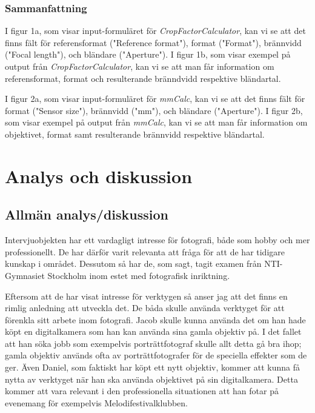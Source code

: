 \documentclass[11pt]{article}
\begin{document}
\clearpage

\subsubsection{Sammanfattning}
\sloppy
I figur 1a, som visar input-formuläret för \emph{CropFactorCalculator}, kan vi
se att det finns fält för referensformat ("Reference format"), format
("Format"), brännvidd ("Focal length"), och bländare ("Aperture"). I figur 1b,
som visar exempel på output från \emph{CropFactorCalculator}, kan vi se att man
får information om referensformat, format och resulterande bränndvidd respektive
bländartal.\par

I figur 2a, som visar input-formuläret för \emph{mmCalc}, kan vi se att det
finns fält för format ("Sensor size"), brännvidd ("mm"), och bländare
("Aperture"). I figur 2b, som visar exempel på output från \emph{mmCalc}, kan vi
se att man får information om objektivet, format samt resulterande brännvidd
respektive bländartal.\par
\fussy

\section{Analys och diskussion}
\subsection{Allmän analys/diskussion}
\sloppy
Intervjuobjekten har ett vardagligt intresse för fotografi, både som hobby och
mer professionellt. De har därför varit relevanta att fråga för att de har
tidigare kunskap i området. Dessutom så har de, som sagt, tagit examen från
NTI-Gymnasiet Stockholm inom estet med fotografisk inriktning. \par

Eftersom att de har visat intresse för verktygen så anser jag att det finns en
rimlig anledning att utveckla det. De båda skulle använda verktyget för att
förenkla sitt arbete inom fotografi. Jacob skulle kunna använda det om han hade
köpt en digitalkamera som han kan använda sina gamla objektiv på. I det fallet
att han söka jobb som exempelvis porträttfotograf skulle allt detta gå bra ihop;
gamla objektiv används ofta av porträttfotografer för de speciella effekter som
de ger. Även Daniel, som faktiskt har köpt ett nytt objektiv, kommer att kunna
få nytta av verktyget när han ska använda objektivet på sin digitalkamera. Detta
kommer att vara relevant i den professionella situationen att han fotar på
evenemang för exempelvis Melodifestivalklubben.\par
\end{document}

